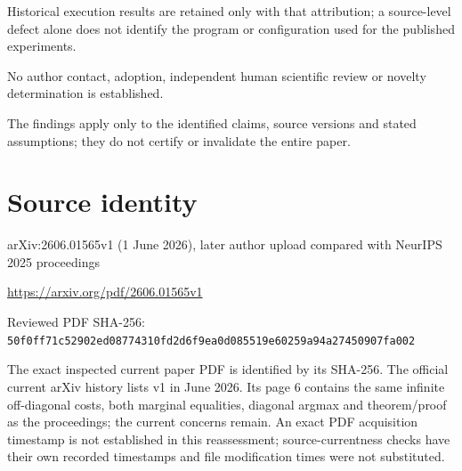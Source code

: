 \documentclass[11pt]{article}
\begin{document}
Historical execution results are retained only with that attribution; a source-level defect alone does not identify the program or configuration used for the published experiments.\par

No author contact, adoption, independent human scientific review or novelty determination is established.\par

The findings apply only to the identified claims, source versions and stated assumptions; they do not certify or invalidate the entire paper.\par

\section*{Source identity}

arXiv:2606.01565v1 (1 June 2026), later author upload compared with NeurIPS 2025 proceedings

\url{https://arxiv.org/pdf/2606.01565v1}

Reviewed PDF SHA-256: \nolinkurl{50f0ff71c52902ed08774310fd2d6f9ea0d085519e60259a94a27450907fa002}

The exact inspected current paper PDF is identified by its SHA-256. The official current arXiv history lists v1 in June 2026. Its page 6 contains the same infinite off-diagonal costs, both marginal equalities, diagonal argmax and theorem/proof as the proceedings; the current concerns remain. An exact PDF acquisition timestamp is not established in this reassessment; source-currentness checks have their own recorded timestamps and file modification times were not substituted.
\end{document}
